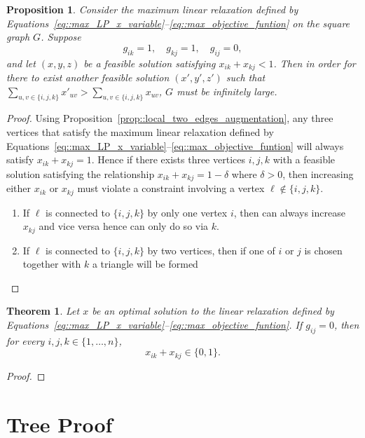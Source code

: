 \documentclass[11pt]{article}
\newtheorem{proposition}{Proposition}
\newtheorem{theorem}{Theorem}
\begin{document}
\begin{proposition} \label{prop::extended_two_edges_augmentation}
  Consider the maximum linear relaxation defined by Equations~\eqref{eq::max_LP_x_variable}--\eqref{eq::max_objective_funtion} on the square graph $G$. Suppose
  \[
  g_{ik}=1,\quad g_{kj}=1,\quad g_{ij}=0,
  \]
  and let $(x,y,z)$ be a feasible solution satisfying $x_{ik}+x_{kj}<1$. Then in order for there to exist another feasible solution $(x',y',z')$ such that $ \displaystyle \sum_{u,v\in\{i,j,k\}}x'_{uv} > \sum_{u,v\in\{i,j,k\}}x_{uv}$, $G$ must be infinitely large.
\end{proposition}
\begin{proof}
  Using Proposition~\ref{prop::local_two_edges_augmentation}, any three vertices that satisfy the maximum linear relaxation defined by Equations~\eqref{eq::max_LP_x_variable}--\eqref{eq::max_objective_funtion} will always satisfy $x_{ik}+x_{kj}=1$. Hence if there exists three vertices $i,j,k$ with a feasible solution satisfying the relationship $x_{ik} + x_{kj} = 1 - \delta$ where $\delta > 0 $, then increasing either $x_{ik}$ or $x_{kj}$ must violate a constraint
  involving a vertex $\ell\notin\{i,j,k\}$.
  \begin{enumerate}[label=\Alph*.]
    \item If $\ell$ is connected to $\{i,j,k\}$ by only one vertex $i$, then can always increase $x_{kj}$ and vice versa hence can only do so via $k$. 
    \item If $\ell$ is connected to $\{i,j,k\}$ by two vertices, then if one of $i$ or $j$ is chosen together with $k$ a triangle will be formed 
  \end{enumerate}

\end{proof}


\begin{theorem} \label{theorem::two_edges_linear_maximization}
  Let $x$ be an optimal solution to the linear relaxation defined by Equations~\eqref{eq::max_LP_x_variable}--\eqref{eq::max_objective_funtion}.
  If $g_{ij}=0$, then for every $i,j,k\in\{1,\dots,n\}$,
  \[
  x_{ik}+x_{kj} \in \{0, 1 \}. 
  \]
\end{theorem}
\begin{proof}
  
\end{proof}

\section{Tree Proof} \label{sec::tree_proof}
\end{document}
